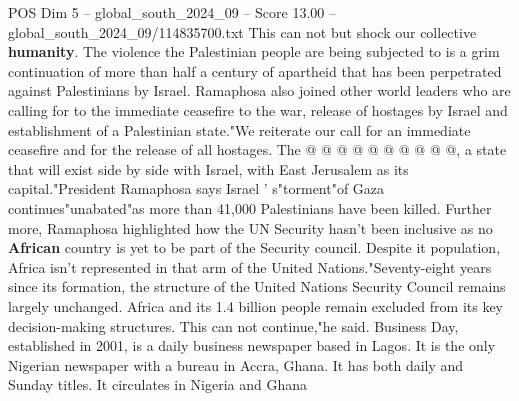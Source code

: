 \begin{textsample}{POS Dim 5 – global\_south\_2024\_09 – Score 13.00 – global\_south\_2024\_09/114835700.txt}
This can not but shock our collective \textbf{humanity}.
The violence the Palestinian people are being subjected to is a grim continuation of more than half a century of apartheid that has been perpetrated against Palestinians by Israel.
Ramaphosa also joined other world leaders who are calling for to the immediate ceasefire to the war, release of hostages by Israel and establishment of a Palestinian state."We reiterate our call for an immediate ceasefire and for the release of all hostages.
The @ @ @ @ @ @ @ @ @ @, a state that will exist side by side with Israel, with East Jerusalem as its capital."President Ramaphosa says Israel ' s"torment"of Gaza continues"unabated"as more than 41,000 Palestinians have been killed.
Further more, Ramaphosa highlighted how the UN Security hasn't been inclusive as no \textbf{African} country is yet to be part of the Security council.
Despite it population, Africa isn't represented in that arm of the United Nations."Seventy-eight years since its formation, the structure of the United Nations Security Council remains largely unchanged.
Africa and its 1.4 billion people remain excluded from its key decision-making structures.
This can not continue,"he said.
Business Day, established in 2001, is a daily business newspaper based in Lagos.
It is the only Nigerian newspaper with a bureau in Accra, Ghana.
It has both daily and Sunday titles.
It circulates in Nigeria and Ghana

\end{textsample}
